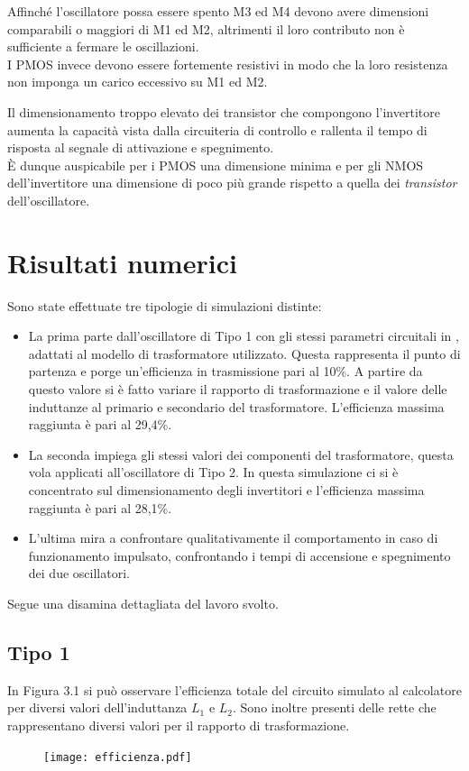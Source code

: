 \documentclass[a4paper, 12pt]{memoir}
\begin{document}
Affinché l'oscillatore possa essere spento M3 ed M4 devono avere dimensioni 
comparabili o maggiori di M1 ed M2, altrimenti il loro contributo non è 
sufficiente a fermare le oscillazioni.\\
I PMOS invece devono essere fortemente resistivi in modo che la loro resistenza
non imponga un carico eccessivo su M1 ed M2.

Il dimensionamento troppo elevato dei transistor che compongono l'invertitore
aumenta la capacità vista dalla circuiteria di controllo e rallenta il tempo di 
risposta al segnale di attivazione e spegnimento.\\
\`E dunque auspicabile per i PMOS una dimensione minima e per gli NMOS 
dell'invertitore una dimensione di poco più grande rispetto a quella dei
\emph{transistor} dell'oscillatore.

\chapter{Risultati numerici}
Sono state effettuate tre tipologie di simulazioni distinte:
\begin{itemize}
\item La prima parte dall'oscillatore di Tipo 1 con gli stessi parametri
	circuitali in \cite{Neviani14}, adattati al modello di trasformatore 
	utilizzato. Questa rappresenta il punto di partenza e porge un'efficienza
	in trasmissione pari al 10\%. A partire da questo valore si è fatto
	variare il rapporto di trasformazione e il valore delle induttanze al
	primario e secondario del trasformatore. L'efficienza massima raggiunta è
	pari al 29,4\%.

\item La seconda impiega gli stessi valori dei componenti del trasformatore,
	questa vola applicati all'oscillatore di Tipo 2. In questa simulazione ci
	si è concentrato sul dimensionamento degli invertitori e l'efficienza
	massima raggiunta è pari al 28,1\%.

\item L'ultima mira a confrontare qualitativamente il comportamento in caso di
	funzionamento impulsato, confrontando i tempi di accensione e spegnimento
	dei due oscillatori.
\end{itemize}
Segue una disamina dettagliata del lavoro svolto.

\section{Tipo 1}
In Figura 3.1 si può osservare l'efficienza totale del circuito simulato al
calcolatore per diversi valori dell'induttanza $L_1$ e $L_2$. Sono inoltre
presenti delle rette che rappresentano diversi valori per il rapporto di
trasformazione.
\begin{figure}[h!]
\centering
\texttt{[image: efficienza.pdf]}
\caption{}
\end{figure}
\end{document}
